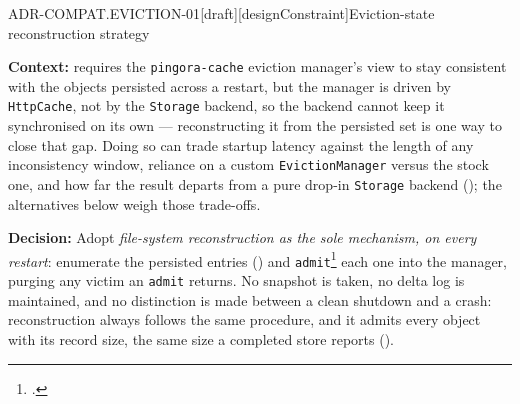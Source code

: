 \begin{requirement}{ADR-COMPAT.EVICTION-01}[draft][designConstraint]{Eviction-state reconstruction strategy}


  \textbf{Context:}  requires the
  \texttt{pingora-cache} eviction manager's view to stay consistent with the
  objects persisted across a restart, but the manager is driven by
  \texttt{HttpCache}, not by the \texttt{Storage} backend, so the backend
  cannot keep it synchronised on its own --- reconstructing it from the
  persisted set is one way to close that gap. Doing so can trade startup
  latency against the length of any inconsistency window, reliance on a
  custom \texttt{EvictionManager} versus the stock one, and how far the
  result departs from a pure drop-in \texttt{Storage} backend
  (); the alternatives below weigh those
  trade-offs.

  \textbf{Decision:} Adopt \emph{file-system reconstruction as the sole
  mechanism, on every restart}: enumerate the persisted entries
  () and
  \texttt{admit}\footnote{.}
  each one into the manager, purging any victim an \texttt{admit} returns.
  No snapshot is taken, no delta log is maintained, and no distinction is
  made between a clean shutdown and a crash: reconstruction always follows
  the same procedure, and it admits every object with its record size, the
  same size a completed store reports ().


\end{requirement}
